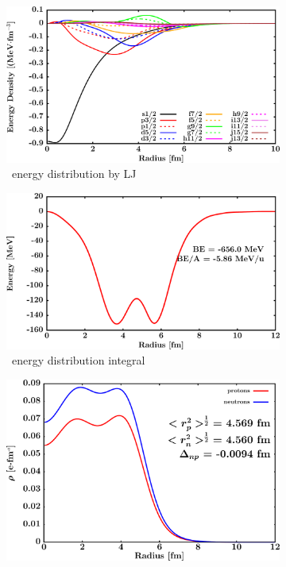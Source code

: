 \begin{figure}[hbtp]
    \begin{subfigure}{0.45\textwidth}
        \centering
        \includegraphics[width=\linewidth]{figures/sn112_EnergyDist.png}
        \caption{\snTwelve\ energy distribution by LJ}
        \label{DOMFitData_sn112_proton_energyDistInt}
    \end{subfigure}\hspace{6pt}
    \begin{subfigure}{0.45\textwidth}
        \centering
        \includegraphics[width=\linewidth]{figures/sn112_EnergyDistIntegral.png}
        \caption{\snTwelve\ energy distribution integral}
        \label{DOMFitData_sn112_neutron_energyDistInt}
    \end{subfigure}\vspace{0.4in}
    \begin{subfigure}{0.70\textwidth}
        \centering
        \includegraphics[width=\linewidth]{figures/sn112_matterDensity.png}

\end{subfigure}
\end{figure}
